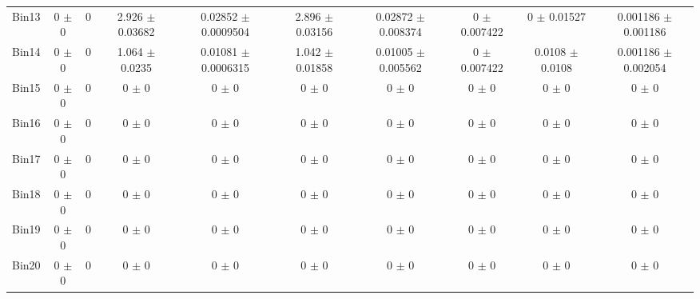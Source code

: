 \begin{tabular}{@{\extracolsep{4pt}}lccccccccc@{}}
     Bin13 & 0 $\pm$ 0 & 0 & 2.926 $\pm$ 0.03682 & 0.02852 $\pm$ 0.0009504 & 2.896 $\pm$ 0.03156 & 0.02872 $\pm$ 0.008374 & 0 $\pm$ 0.007422 & 0 $\pm$ 0.01527 & 0.001186 $\pm$ 0.001186 \\ 
     Bin14 & 0 $\pm$ 0 & 0 & 1.064 $\pm$ 0.0235 & 0.01081 $\pm$ 0.0006315 & 1.042 $\pm$ 0.01858 & 0.01005 $\pm$ 0.005562 & 0 $\pm$ 0.007422 & 0.0108 $\pm$ 0.0108 & 0.001186 $\pm$ 0.002054 \\ 
     Bin15 & 0 $\pm$ 0 & 0 & 0 $\pm$ 0 & 0 $\pm$ 0 & 0 $\pm$ 0 & 0 $\pm$ 0 & 0 $\pm$ 0 & 0 $\pm$ 0 & 0 $\pm$ 0 \\ 
     Bin16 & 0 $\pm$ 0 & 0 & 0 $\pm$ 0 & 0 $\pm$ 0 & 0 $\pm$ 0 & 0 $\pm$ 0 & 0 $\pm$ 0 & 0 $\pm$ 0 & 0 $\pm$ 0 \\ 
     Bin17 & 0 $\pm$ 0 & 0 & 0 $\pm$ 0 & 0 $\pm$ 0 & 0 $\pm$ 0 & 0 $\pm$ 0 & 0 $\pm$ 0 & 0 $\pm$ 0 & 0 $\pm$ 0 \\ 
     Bin18 & 0 $\pm$ 0 & 0 & 0 $\pm$ 0 & 0 $\pm$ 0 & 0 $\pm$ 0 & 0 $\pm$ 0 & 0 $\pm$ 0 & 0 $\pm$ 0 & 0 $\pm$ 0 \\ 
     Bin19 & 0 $\pm$ 0 & 0 & 0 $\pm$ 0 & 0 $\pm$ 0 & 0 $\pm$ 0 & 0 $\pm$ 0 & 0 $\pm$ 0 & 0 $\pm$ 0 & 0 $\pm$ 0 \\ 
     Bin20 & 0 $\pm$ 0 & 0 & 0 $\pm$ 0 & 0 $\pm$ 0 & 0 $\pm$ 0 & 0 $\pm$ 0 & 0 $\pm$ 0 & 0 $\pm$ 0 & 0 $\pm$ 0 \\ 
\hline\hline
  \end{tabular}
